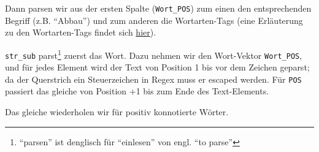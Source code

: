 \documentclass[12pt,]{book}
\newenvironment{Shaded}{\begin{snugshade}}{\end{snugshade}}
\newcommand{\KeywordTok}[1]{\textcolor[rgb]{0.13,0.29,0.53}{\textbf{{#1}}}}
\newcommand{\DataTypeTok}[1]{\textcolor[rgb]{0.13,0.29,0.53}{{#1}}}
\newcommand{\DecValTok}[1]{\textcolor[rgb]{0.00,0.00,0.81}{{#1}}}
\newcommand{\CharTok}[1]{\textcolor[rgb]{0.31,0.60,0.02}{{#1}}}
\newcommand{\StringTok}[1]{\textcolor[rgb]{0.31,0.60,0.02}{{#1}}}
\newcommand{\OtherTok}[1]{\textcolor[rgb]{0.56,0.35,0.01}{{#1}}}
\newcommand{\NormalTok}[1]{{#1}}
\let\rmarkdownfootnote\footnote%
\def\footnote{\protect\rmarkdownfootnote}
\begin{document}
Dann parsen wir aus der ersten Spalte (\texttt{Wort\_POS}) zum einen den
entsprechenden Begriff (z.B. ``Abbau'') und zum anderen die
Wortarten-Tags (eine Erläuterung zu den Wortarten-Tags findet sich
\href{http://www.jlcl.org/2013_Heft1/H2013-1.pdf}{hier}).

\begin{Shaded}
\end{Shaded}

\texttt{str\_sub} parst\footnote{``parsen'' ist denglisch für
  ``einlesen'' von engl. ``to parse''} zuerst das Wort. Dazu nehmen wir
den Wort-Vektor \texttt{Wort\_POS}, und für jedes Element wird der Text
von Position 1 bis vor dem Zeichen \texttt{\textbar{}} geparst; da der
Querstrich ein Steuerzeichen in Regex muss er escaped werden. Für
\texttt{POS} passiert das gleiche von Position \texttt{\textbar{}}+1 bis
zum Ende des Text-Elements.

Das gleiche wiederholen wir für positiv konnotierte Wörter.

\begin{Shaded}
\end{Shaded}
\end{document}

